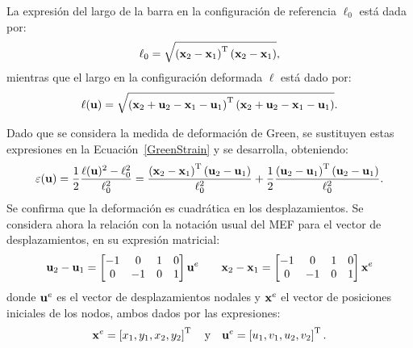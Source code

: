 La expresión del largo de la barra en la configuración de referencia $\ell_0$ está dada por:
%
\begin{equation}
\ell_0 = \sqrt{ \left( {\bf x}_2 - {\bf x}_1\right)^{\text{T}} \left( {\bf x}_2 - {\bf x}_1\right)},
\end{equation}
%
mientras que el largo en la configuración deformada $\ell$ está dado por:
%
\begin{equation}
\ell ({\bf u})
= \sqrt{
	\left( {\bf x}_2+{\bf u}_2 - {\bf x}_1 -{\bf u}_1 \right)^{\text{T}}
	\left( {\bf x}_2+{\bf u}_2 - {\bf x}_1 -{\bf u}_1 \right)
}.
\end{equation}
%


Dado que se considera la medida de deformación de Green, se sustituyen estas expresiones en la Ecuación~\eqref{GreenStrain} y se desarrolla, obteniendo:
%
\begin{equation}\label{eqn:eceps}
\varepsilon({\bf u}) 
= \frac{1}{2} \frac{\ell({\bf u})^2 - \ell_0^2}{\ell^2_0} 
= \frac{  \left({\bf x}_{2}-{\bf x}_1 \right)^{\text{T}} \left({\bf u}_{2}-{\bf u}_1 \right) }{\ell^2_0}
+ \frac{1}{2} \frac{ \left({\bf u}_{2}-{\bf u}_1 \right)^{\text{T}} \left({\bf u}_{2}-{\bf u}_1 \right) }{\ell^2_0}.
\end{equation}
%
Se confirma que la deformación es cuadrática en los desplazamientos. %
%
Se considera ahora la relación con la notación usual del MEF para el vector de desplazamientos, en su expresión matricial:
%
\begin{equation}\label{eqn:expru21}
{\bf u}_2 - {\bf u}_1 = \left[ \begin{matrix}
-1 & 0 &  1 &  0 \\
0 & -1 &  0 &  1 \\
\end{matrix} 
\right] {\bf u}^e
\qquad
{\bf x}_2 - {\bf x}_1 = \left[ \begin{matrix}
-1 & 0 &  1 &  0 \\
0 & -1 &  0 &  1 \\
\end{matrix} 
\right] {\bf x}^e
\end{equation}
%
donde ${\bf u}^e$ es el vector de desplazamientos nodales y ${\bf x}^e$ el vector de posiciones iniciales de los nodos, ambos dados por las expresiones:
%
\begin{equation}
{\bf x}^e = \left[ x_1, y_1, x_2, y_2 \right]^{\text{T}}
\quad \text{y} \quad
{\bf u}^e = \left[ u_1, v_1, u_2, v_2 \right]^{\text{T}}.
\end{equation}
%


